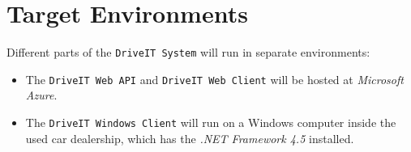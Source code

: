 \section{Target Environments}
Different parts of the \texttt{DriveIT System} will run in separate environments:
\begin{itemize}
	\item The \texttt{DriveIT Web API} and \texttt{DriveIT Web Client} will be hosted at \textit{Microsoft Azure}.
	\item The \texttt{DriveIT Windows Client} will run on a Windows computer inside the used car dealership, which has the \textit{.NET Framework 4.5} installed.
\end{itemize}